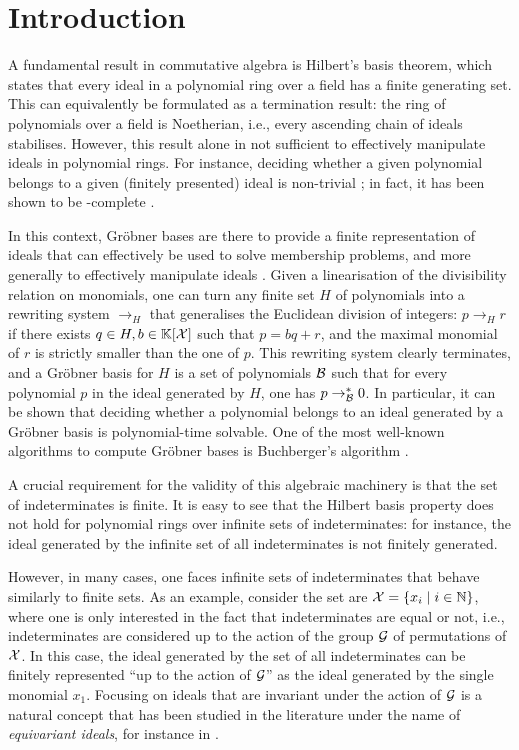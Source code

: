 \section{Introduction}
\label{sec:intro}

A fundamental result in commutative algebra is Hilbert’s basis theorem, which
states that every ideal in a polynomial ring over a field has a finite
generating set. This can equivalently be formulated as a termination result:
the ring of polynomials over a field is Noetherian, i.e., every ascending chain
of ideals stabilises.
However, this result alone in not sufficient to effectively
manipulate ideals in polynomial rings. For instance, deciding 
whether a given polynomial belongs to a given (finitely presented) ideal
is non-trivial ; in fact, it has been shown to be \EXPTIME-complete
\cite{MAME82}.

In this context, Gröbner bases are there to provide a finite representation of
ideals that can effectively be used to solve membership problems, and more
generally to effectively manipulate ideals \cite{CLO15}. Given a linearisation
of the divisibility relation on monomials, one can turn any finite set $H$ of
polynomials into a rewriting system $\to_H$ that generalises the Euclidean
division of integers: $p \to_H r$ if there exists $q \in H, b \in
\mathbb{K}[\mathcal{X}]$ such that $p = bq + r$, and the maximal monomial of $r$ is
strictly smaller than the one of $p$. This rewriting system clearly terminates,
and a Gröbner basis for $H$ is a set of polynomials $\Basis$ such that for
every polynomial $p$ in the ideal generated by $H$, one has $p \to_{\Basis}^*
0$. In particular, it can be shown that deciding whether a polynomial belongs
to an ideal generated by a Gröbner basis is polynomial-time solvable. One of
the most well-known algorithms to compute Gröbner bases is Buchberger's
algorithm \cite{BUCH76}.

A crucial requirement for the validity of this algebraic machinery is that the
set of indeterminates is finite. It is easy to see that the Hilbert basis
property does not hold for polynomial rings over infinite sets of
indeterminates: for instance, the ideal generated by the infinite set of all
indeterminates is not finitely generated.

However, in many cases, one faces infinite sets of indeterminates that behave
similarly to finite sets. As an example, consider the set are $\mathcal{X} =
\{ x_i \mid i \in \mathbb{N} \}$, where one is only interested in the fact that
indeterminates are equal or not, i.e., indeterminates are considered up to the
action of the group $\mathcal{G}$ of permutations of $\mathcal{X}$. In this case, the ideal
generated by the set of all indeterminates can be finitely represented ``up to
the action of $\mathcal{G}$'' as the ideal generated by the single monomial $x_1$.
Focusing on ideals that are invariant under the action of $\mathcal{G}$ is a
natural concept that has been studied in the literature under the name of
\emph{equivariant ideals}, for instance in \cite{BRDR11,HIKRLE18,GHOLAS24}.

